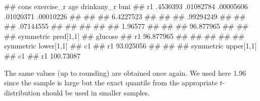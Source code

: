 \documentclass[
  letterpaper,
  DIV=11,
  numbers=noendperiod]{scrreprt}
\newenvironment{Shaded}{\begin{snugshade}}{\end{snugshade}}
\newcommand{\FunctionTok}[1]{\textcolor[rgb]{0.28,0.35,0.67}{#1}}
\newcommand{\NormalTok}[1]{\textcolor[rgb]{0.00,0.23,0.31}{#1}}
\begin{document}
\begin{Shaded}
\begin{Highlighting}[]
\NormalTok{\#\#           cons  exercise\_r         age  drinkany\_r         bmi}
\NormalTok{\#\# r1    .4530393   .01082784   .00005606   .01020371   .00010226}
\NormalTok{\#\# }
\NormalTok{\#\# }
\NormalTok{\#\# 6.4227523}
\NormalTok{\#\# }
\NormalTok{\#\# }
\NormalTok{\#\# .99294249}
\NormalTok{\#\# }
\NormalTok{\#\# }
\NormalTok{\#\# .07144555}
\NormalTok{\#\# }
\NormalTok{\#\# }
\NormalTok{\#\# }
\NormalTok{\#\# }
\NormalTok{\#\# 1.96577}
\NormalTok{\#\# }
\NormalTok{\#\# }
\NormalTok{\#\# 96.877965}
\NormalTok{\#\# }
\NormalTok{\#\# }
\NormalTok{\#\# symmetric pred[1,1]}
\NormalTok{\#\#       glucose}
\NormalTok{\#\# r1  96.877965}
\NormalTok{\#\# }
\NormalTok{\#\# }
\NormalTok{\#\# }
\NormalTok{\#\# }
\NormalTok{\#\# symmetric }\FunctionTok{lower}\NormalTok{[1,1]}
\NormalTok{\#\#            c1}
\NormalTok{\#\# r1  93.025056}
\NormalTok{\#\# }
\NormalTok{\#\# }
\NormalTok{\#\# symmetric }\FunctionTok{upper}\NormalTok{[1,1]}
\NormalTok{\#\#            c1}
\NormalTok{\#\# r1  100.73087}
\end{Highlighting}
\end{Shaded}

The same values (up to rounding) are obtained once again. We used here
1.96 since the sample is large but the exact quantile from the
appropriate \(t\)-distribution should be used in smaller samples.
\end{document}
